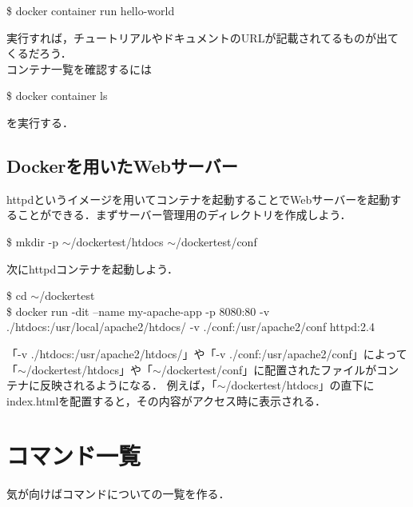 \documentclass[dvipdfmx,a4paper,11pt]{jsbook}
\begin{document}
\begin{tcolorbox}[terminalbox]
  \$ docker container run hello-world
\end{tcolorbox}
実行すれば，チュートリアルやドキュメントのURLが記載されてるものが出てくるだろう．\\
コンテナ一覧を確認するには
\begin{tcolorbox}[terminalbox]
  \$ docker container ls
\end{tcolorbox}
を実行する．

\section{Dockerを用いたWebサーバー}
httpdというイメージを用いてコンテナを起動することでWebサーバーを起動することができる．まずサーバー管理用のディレクトリを作成しよう．
\begin{tcolorbox}[terminalbox]
  \$ mkdir -p $\sim$/dockertest/htdocs $\sim$/dockertest/conf
\end{tcolorbox}
次にhttpdコンテナを起動しよう．
\begin{tcolorbox}[terminalbox]
  \$ cd $\sim$/dockertest\\
  \$ docker run -dit --name my-apache-app -p 8080:80 -v ./htdocs:/usr/local/apache2/htdocs/ -v ./conf:/usr/apache2/conf httpd:2.4
\end{tcolorbox}
「-v ./htdocs:/usr/apache2/htdocs/」や「-v ./conf:/usr/apache2/conf」によって
「$\sim$/dockertest/htdocs」や「$\sim$/dockertest/conf」に配置されたファイルがコンテナに反映されるようになる．
例えば，「$\sim$/dockertest/htdocs」の直下にindex.htmlを配置すると，その内容がアクセス時に表示される．







\appendix
\chapter{コマンド一覧}
気が向けばコマンドについての一覧を作る．
\end{document}
